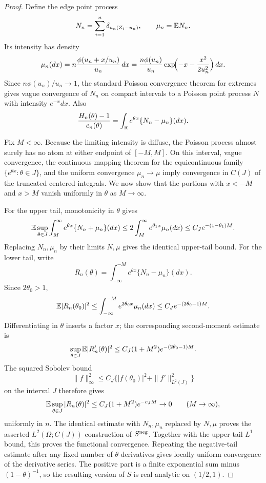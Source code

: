 \begin{proof}
Define the edge point process
\[
    N_n=\sum_{i=1}^n\delta_{u_n(Z_i-u_n)},
    \qquad
    \mu_n=\mathbb{E} N_n.
\]
Its intensity has density
\[
    \mu_n(dx)
    =
    n\frac{\phi(u_n+x/u_n)}{u_n}\,dx
    =
    \frac{n\phi(u_n)}{u_n}
    \exp\!\Bigl(-x-\frac{x^2}{2u_n^2}\Bigr)\,dx.
\]
Since $n\phi(u_n)/u_n\to1$, the standard Poisson convergence theorem for extremes \cite{kallenberg2017random} gives vague convergence of $N_n$ on compact intervals to a Poisson point process $N$ with intensity $e^{-x}dx$. Also
\[
    \frac{H_n(\theta)-1}{c_n(\theta)}
    =
    \int_{\mathbb{R}} e^{\theta x}\{N_n-\mu_n\}(dx).
\]

Fix \(M<\infty\). Because the limiting intensity is diffuse, the Poisson
process almost surely has no atom at either endpoint of \([-M,M]\). On this
interval, vague convergence, the continuous mapping theorem for the
equicontinuous family $\{e^{\theta x}:\theta\in J\}$, and the uniform
convergence $\mu_n\to\mu$ imply convergence in $C(J)$ of the truncated
centered integrals. We now show that the portions with $x<-M$ and $x>M$
vanish uniformly in \(\theta\) as \(M\to\infty\).

For the upper tail, monotonicity in $\theta$ gives
\[
    \mathbb{E}\sup_{\theta\in J}
    \int_M^\infty e^{\theta x}\{N_n+\mu_n\}(dx)
    \le
    2\int_M^\infty e^{\theta_1x}\mu_n(dx)
    \le
    C_J e^{-(1-\theta_1)M}.
\]
Replacing $N_n,\mu_n$ by their limits $N,\mu$ gives the identical upper-tail
bound.
For the lower tail, write
\[
    R_n(\theta)
    =
    \int_{-\infty}^{-M} e^{\theta x}\{N_n-\mu_n\}(dx).
\]
Since $2\theta_0>1$,
\[
    \mathbb{E} |R_n(\theta_0)|^2
    \le
    \int_{-\infty}^{-M}e^{2\theta_0x}\mu_n(dx)
    \le
    C_J e^{-(2\theta_0-1)M}.
\]
Differentiating in \(\theta\) inserts a factor \(x\); the corresponding
second-moment estimate is
\[
    \sup_{\theta\in J}
    \mathbb{E} |R_n'(\theta)|^2
    \le
    C_J(1+M^2)e^{-(2\theta_0-1)M}.
\]
The squared Sobolev bound
\[
    \|f\|_\infty^2
    \le
    C_J\{|f(\theta_0)|^2+\|f'\|_{L^2(J)}^2\}
\]
on the interval $J$ therefore gives
\[
    \mathbb{E}\sup_{\theta\in J}|R_n(\theta)|^2
    \le
    C_J(1+M^2)e^{-c_JM}\to0
    \qquad(M\to\infty),
\]
uniformly in $n$. The identical estimate with \(N_n,\mu_n\) replaced by
\(N,\mu\) proves the asserted \(L^2(\Omega;C(J))\) construction of
\(S^{\rm neg}\). Together with the upper-tail \(L^1\) bound, this proves the
functional convergence. Repeating the negative-tail estimate after any fixed
number of \(\theta\)-derivatives gives locally uniform convergence of the
derivative series. The positive part is a finite exponential sum minus
\((1-\theta)^{-1}\), so the resulting version of \(S\) is real analytic on
\((1/2,1)\).


\end{proof}
